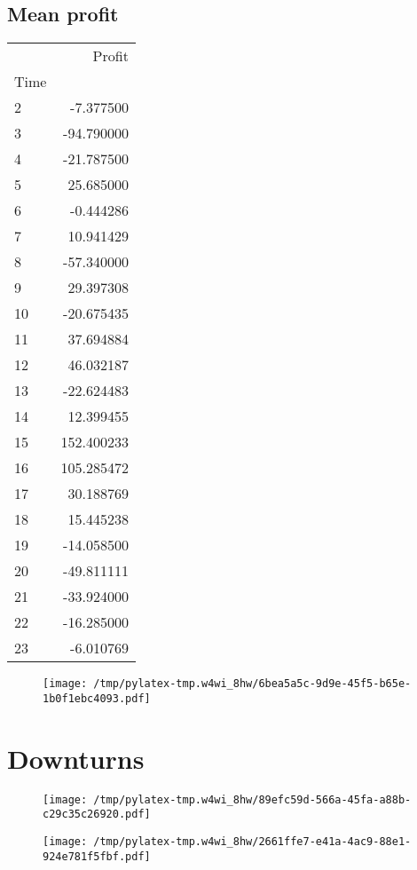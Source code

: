 \documentclass{article}%
\begin{document}
\subsection{Mean profit }%
\label{subsec:Meanprofit}%
\begin{tabular}{lr}
\toprule
{} &      Profit \\
Time &             \\
\midrule
2    &   -7.377500 \\
3    &  -94.790000 \\
4    &  -21.787500 \\
5    &   25.685000 \\
6    &   -0.444286 \\
7    &   10.941429 \\
8    &  -57.340000 \\
9    &   29.397308 \\
10   &  -20.675435 \\
11   &   37.694884 \\
12   &   46.032187 \\
13   &  -22.624483 \\
14   &   12.399455 \\
15   &  152.400233 \\
16   &  105.285472 \\
17   &   30.188769 \\
18   &   15.445238 \\
19   &  -14.058500 \\
20   &  -49.811111 \\
21   &  -33.924000 \\
22   &  -16.285000 \\
23   &   -6.010769 \\
\bottomrule
\end{tabular}
%


\begin{figure}[htbp]%
\centering%
\texttt{[image: /tmp/pylatex-tmp.w4wi\_8hw/6bea5a5c-9d9e-45f5-b65e-1b0f1ebc4093.pdf]}%
\end{figure}

%
\section{Downturns}%
\label{sec:Downturns}%


\begin{figure}[htbp]%
\centering%
\texttt{[image: /tmp/pylatex-tmp.w4wi\_8hw/89efc59d-566a-45fa-a88b-c29c35c26920.pdf]}%
\end{figure}

%


\begin{figure}[htbp]%
\centering%
\texttt{[image: /tmp/pylatex-tmp.w4wi\_8hw/2661ffe7-e41a-4ac9-88e1-924e781f5fbf.pdf]}%
\end{figure}

%
\end{document}

